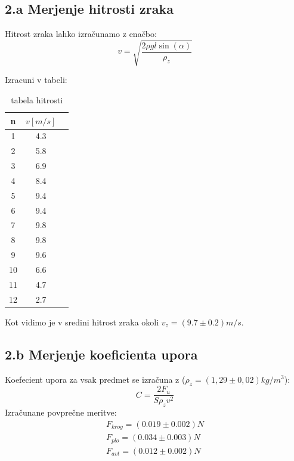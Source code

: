 \documentclass[11pt]{article}
\begin{document}
    \subsection{2.a Merjenje hitrosti zraka}

    Hitrost zraka lahko izračunamo z enačbo:
    \[
        v = \sqrt{\frac{2 \rho g l \sin(\alpha)}{\rho_z}}
    \]

    Izracuni v tabeli:
    \begin{table}[H]
        \centering
        \begin{tabular}{|c|c|c|}
            \hline
            n & $v [m/s]$ \\
            \hline
            1	& 4.3  \\
            2	& 5.8  \\
            3	& 6.9  \\
            4	& 8.4  \\
            5	& 9.4  \\
            6	& 9.4  \\
            7	& 9.8  \\
            8	& 9.8  \\
            9	& 9.6  \\
            10	& 6.6  \\
            11	& 4.7  \\
            12	& 2.7  \\
            \hline
        \end{tabular}
        \caption{tabela hitrosti}
        \label{tab:4}
    \end{table}
    Kot vidimo je v sredini hitrost zraka okoli $v_z = (9.7 \pm 0.2) m/s$.

    \subsection{2.b Merjenje koeficienta upora}
    Koefecient upora za vsak predmet se izračuna z ($\rho_z = (1,29 \pm 0,02) kg/m^3$):
    \[
        C = \frac{2 F_u}{S \rho_z v^2}
    \]
    Izračunane povprečne meritve:
    \begin{align*}
        F_{krog} = (0.019 \pm 0.002) N \\
        F_{plo} = (0.034 \pm 0.003) N \\
        F_{avt} = (0.012 \pm 0.002) N
    \end{align*}
\end{document}
